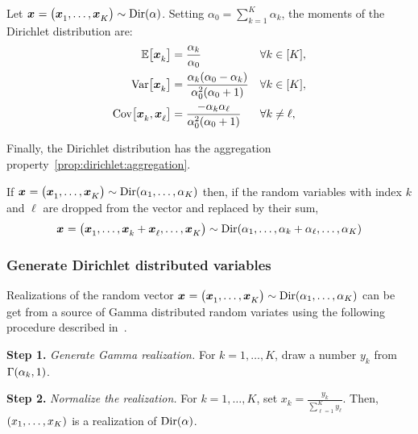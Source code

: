 Let $\va x=\bracket{\va x_1,\ldots,\va x_K}\sim \Dir\bracket{\alpha}$. Setting $\alpha_0=\sum_{k=1}^K\alpha_k$, the moments of the Dirichlet distribution are:
\begin{subequations}\label{eq:dirchlet:moments}
  \begin{align}
    \espe\sqbracket{\va x_k} &= \frac{\alpha_k}{\alpha_0} && \forall k\in\range{K},
    \label{eq:dirchlet:moments:mean}
    \\
    \vari\sqbracket{\va x_k} &= \frac{\alpha_k\bracket{\alpha_0-\alpha_k}}{\alpha_0^2\bracket{\alpha_0+1}} && \forall k\in\range{K},
    \label{eq:dirchlet:moments:mean}
    \\
    \cova\sqbracket{\va x_k,\va x_{\ell}} &= \frac{-\alpha_k\alpha_{\ell}}{\alpha_0^2\bracket{\alpha_0+1}} && \forall k\ne\ell,
    \label{eq:dirchlet:moments:mean}
  \end{align}
\end{subequations}


Finally, the Dirichlet distribution has the aggregation property~\ref{prop:dirichlet:aggregation}.

\begin{prop}\label{prop:dirichlet:aggregation}
  If $\va x=\bracket{\va x_1,\ldots,\va x_K}\sim \Dir\bracket{\alpha_1,\ldots,\alpha_K}$ then, if the random variables with index $k$ and $\ell$ are dropped from the vector and replaced by their sum,
  $$\va x=\bracket{\va x_1,\ldots,\va x_k+\va x_{\ell},\ldots,\va x_K}\sim \Dir\bracket{\alpha_1,\ldots,\alpha_k+\alpha_{\ell},\ldots,\alpha_K}$$
\end{prop}



\subsubsection{Generate Dirichlet distributed variables}


Realizations of the random vector $\va x=\bracket{\va x_1,\ldots,\va x_K}\sim\Dir\bracket{\alpha_1,\ldots,\alpha_K}$ can be get from a source of Gamma distributed random variates using the following procedure described in~\cite{Frigyik2010}.

\textbf{Step 1.} \emph{Generate Gamma realization.} For $k=1,\ldots,K$, draw a number $y_k$ from $\Gamma\bracket{\alpha_k,1}$.

\textbf{Step 2.} \emph{Normalize the realization.} For $k=1,\ldots,K$, set $x_k=\frac{y_k}{\sum_{\ell=1}^K y_{\ell}}$. Then, $\bracket{x_1,\ldots,x_K}$ is a realization of $\Dir\bracket{\alpha}$.


